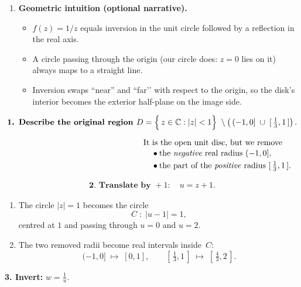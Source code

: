 \documentclass[12pt]{article}
\theoremstyle{definition} %
\theoremstyle{plain} %
\begin{document}
\begin{enumerate}
\item \textbf{Geometric intuition (optional narrative).}
      \begin{itemize}
        \item \(f(z)=1/z\) equals inversion in the unit circle followed by a reflection in the real axis.
        \item A circle passing through the origin (our circle does: \(z=0\) lies on it) always maps to a straight line.
        \item Inversion swaps “near” and “far’’ with respect to the origin, so the disk’s interior becomes the exterior half-plane on the image side.
      \end{itemize}
\end{enumerate}
\pagebreak
\begin{align}
  \textbf{1.  Describe the original region }D
  &=\Bigl\{\,z\in\Bbb C : |z|<1\Bigr\}\;
     \setminus\left(\,(-1,0]\;\cup\;[\,\tfrac13,1\,]\right).\\[6pt]
  &\text{It is the open unit disc, but we remove}          \\[-2pt]
  &\quad\bullet\text{the \emph{negative} real radius }(-1,0],          \\[-1pt]
  &\quad\bullet\text{the part of the \emph{positive} radius }[\,\tfrac13,1\,].
  \end{align}
  
  \bigskip
  \begin{align}
  \textbf{2.  Translate by }+1:\quad u=z+1.
  \end{align}
  
  \begin{enumerate}
  \item The circle $|z|=1$ becomes the circle
        \[
           C\;:\;|u-1|=1,
        \]
        centred at $1$ and passing through $u=0$ and $u=2$.
  \item The two removed radii become real intervals inside~$C$:
        \[
          (-1,0]\;\mapsto\;[0,1], 
          \qquad
          [\,\tfrac13,1\,]\;\mapsto\;[\,\tfrac43,2\,].
        \]
  \end{enumerate}
  
  \bigskip
  \textbf{3.  Invert:}\; $w=\displaystyle\frac1u$.
  
\end{document}
